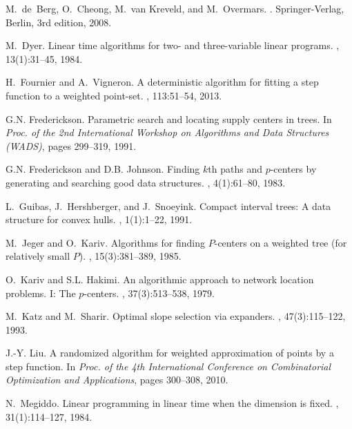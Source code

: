 \documentclass{llncs}
\begin{document}
\begin{thebibliography}{10}
M.~de~Berg, O.~Cheong, M.~van Kreveld, and M.~Overmars.
.
\newblock Springer-Verlag, Berlin, 3rd edition, 2008.

M.~Dyer.
\newblock Linear time algorithms for two- and three-variable linear programs.
, 13(1):31--45, 1984.

H.~Fournier and A.~Vigneron.
\newblock A deterministic algorithm for fitting a step function to a weighted
  point-set.
, 113:51--54, 2013.

G.N. Frederickson.
\newblock Parametric search and locating supply centers in trees.
\newblock In {\em Proc. of the 2nd International Workshop on Algorithms and
  Data Structures (WADS)}, pages 299--319, 1991.

G.N. Frederickson and D.B. Johnson.
\newblock Finding {$k$th} paths and {$p$-centers} by generating and searching
  good data structures.
, 4(1):61--80, 1983.

L.~Guibas, J.~Hershberger, and J.~Snoeyink.
\newblock Compact interval trees: A data structure for convex hulls.
, 1(1):1--22, 1991.

M.~Jeger and O.~Kariv.
\newblock Algorithms for finding {$P$-centers} on a weighted tree (for
  relatively small {$P$}).
, 15(3):381--389, 1985.

O.~Kariv and S.L. Hakimi.
\newblock An algorithmic approach to network location problems. {I: The}
  $p$-centers.
, 37(3):513--538, 1979.

M.~Katz and M.~Sharir.
\newblock Optimal slope selection via expanders.
, 47(3):115--122, 1993.

J.-Y. Liu.
\newblock A randomized algorithm for weighted approximation of points by a step
  function.
\newblock In {\em Proc. of the 4th International Conference on Combinatorial
  Optimization and Applications}, pages 300--308, 2010.

N.~Megiddo.
\newblock Linear programming in linear time when the dimension is fixed.
, 31(1):114--127, 1984.


\end{thebibliography}
\end{document}
